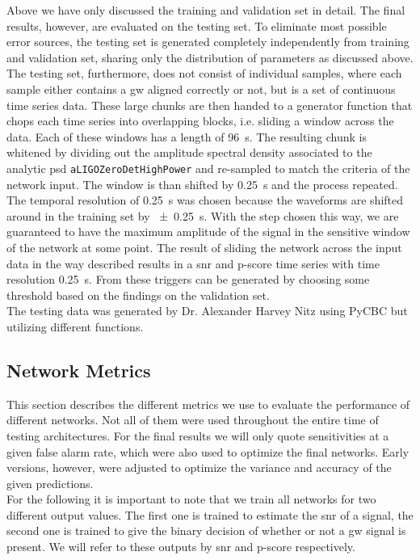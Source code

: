 Above we have only discussed the training and validation set in detail. The final results, however, are evaluated on the testing set. To eliminate most possible error sources, the testing set is generated completely independently from training and validation set, sharing only the distribution of parameters as discussed above. The testing set, furthermore, does not consist of individual samples, where each sample either contains a \gls{gw} aligned correctly or not, but is a set of continuous time series data. These large chunks are then handed to a generator function that chops each time series into overlapping blocks, i.e. sliding a window across the data. Each of these windows has a length of \SI{96}{\s}. The resulting chunk is whitened by dividing out the amplitude spectral density associated to the analytic \gls{psd} \verb|aLIGOZeroDetHighPower| and re-sampled to match the criteria of the network input. The window is than shifted by \SI{0.25}{\s} and the process repeated. The temporal resolution of \SI{0.25}{\s} was chosen because the waveforms are shifted around in the training set by \SI{\pm 0.25}{\s}. With the step chosen this way, we are guaranteed to have the maximum amplitude of the signal in the sensitive window of the network at some point. The result of sliding the network across the input data in the way described results in a \gls{snr} and p-score time series with time resolution \SI{0.25}{\s}. From these triggers can be generated by choosing some threshold based on the findings on the validation set.\\
The testing data was generated by Dr. Alexander Harvey Nitz using PyCBC but utilizing different functions.

\subsection{Network Metrics}\label{sec:network_metrics}
This section describes the different metrics we use to evaluate the performance of different networks. Not all of them were used throughout the entire time of testing architectures. For the final results we will only quote sensitivities at a given false alarm rate, which were also used to optimize the final networks. Early versions, however, were adjusted to optimize the variance and accuracy of the given predictions.\\
For the following it is important to note that we train all networks for two different output values. The first one is trained to estimate the \gls{snr} of a signal, the second one is trained to give the binary decision of whether or not a \gls{gw} signal is present. We will refer to these outputs by \gls{snr} and p-score respectively.

